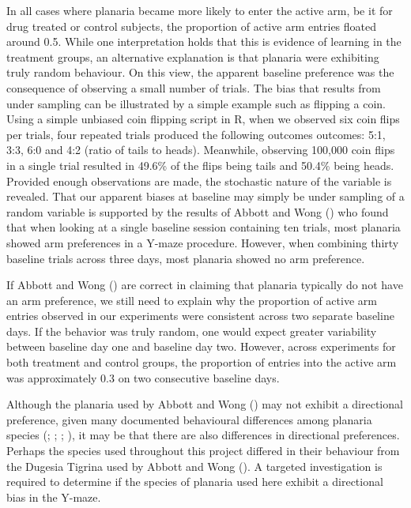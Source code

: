 \documentclass[
  jou,
  floatsintext,
  longtable,
  nolmodern,
  notxfonts,
  notimes,
  donotrepeattitle,
  colorlinks=true,linkcolor=blue,citecolor=blue,urlcolor=blue]{apa7}
\begin{document}
In all cases where planaria became more likely to enter the active arm,
be it for drug treated or control subjects, the proportion of active arm
entries floated around 0.5. While one interpretation holds that this is
evidence of learning in the treatment groups, an alternative explanation
is that planaria were exhibiting truly random behaviour. On this view,
the apparent baseline preference was the consequence of observing a
small number of trials. The bias that results from under sampling can be
illustrated by a simple example such as flipping a coin. Using a simple
unbiased coin flipping script in R, when we observed six coin flips per
trials, four repeated trials produced the following outcomes outcomes:
5:1, 3:3, 6:0 and 4:2 (ratio of tails to heads). Meanwhile, observing
100,000 coin flips in a single trial resulted in 49.6\% of the flips
being tails and 50.4\% being heads. Provided enough observations are
made, the stochastic nature of the variable is revealed. That our
apparent biases at baseline may simply be under sampling of a random
variable is supported by the results of Abbott and Wong
() who found that when
looking at a single baseline session containing ten trials, most
planaria showed arm preferences in a Y-maze procedure. However, when
combining thirty baseline trials across three days, most planaria showed
no arm preference.

If Abbott and Wong () are
correct in claiming that planaria typically do not have an arm
preference, we still need to explain why the proportion of active arm
entries observed in our experiments were consistent across two separate
baseline days. If the behavior was truly random, one would expect
greater variability between baseline day one and baseline day two.
However, across experiments for both treatment and control groups, the
proportion of entries into the active arm was approximately 0.3 on two
consecutive baseline days.

Although the planaria used by Abbott and Wong
() may not exhibit a
directional preference, given many documented behavioural differences
among planaria species
(; ;
;
), it
may be that there are also differences in directional preferences.
Perhaps the species used throughout this project differed in their
behaviour from the Dugesia Tigrina used by Abbott and Wong
(). A targeted
investigation is required to determine if the species of planaria used
here exhibit a directional bias in the Y-maze.
\end{document}
